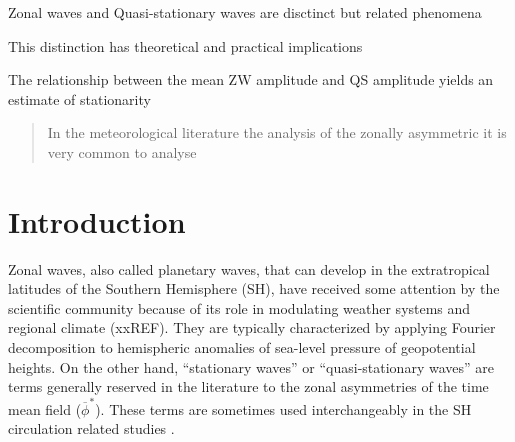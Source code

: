 \documentclass[draft,linenumbers]{agujournal2018}
\begin{document}



\begin{keypoints}
\item Zonal waves and Quasi-stationary waves are disctinct but related
phenomena
\item This distinction has theoretical and practical implications
\item The relationship between the mean ZW amplitude and QS amplitude yields
an estimate of stationarity
\end{keypoints}

%
%


\begin{abstract}
In the meteorological literature the analysis of the zonally asymmetric
it is very common to analyse
\end{abstract}

\section{Introduction}

Zonal waves, also called planetary waves, that can develop in the
extratropical latitudes of the Southern Hemisphere (SH), have received
some attention by the scientific community because of its role in
modulating weather systems and regional climate (xxREF). They are
typically characterized by applying Fourier decomposition to hemispheric
anomalies of sea-level pressure of geopotential heights. On the other
hand, ``stationary waves'' or ``quasi-stationary waves'' are terms
generally reserved in the literature to the zonal asymmetries of the
time mean field (\(\overline{\phi}^*\)). These terms are sometimes used
interchangeably in the SH circulation related studies
\citep[e.g.][]{Rao2004, Raphael2004, Kravchenko2012, Irving2015, Turner2017, Lastovicka2018}.
\end{document}

